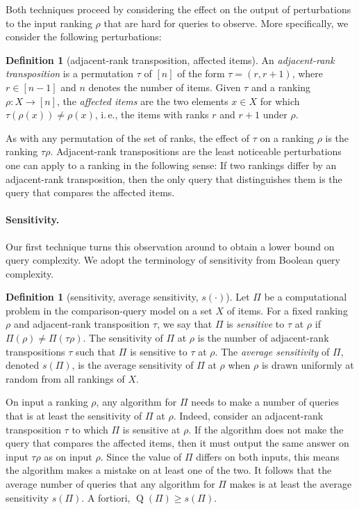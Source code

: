 \documentclass[11pt]{article}
\numberwithin{equation}{section}
\theoremstyle{definition}
\newtheorem{definition}[theorem]{Definition}
\theoremstyle{plain}
\newcommand{\ie}{i.\,e.}
\newcommand{\ranking}{\rho}
\newcommand{\transposition}{\tau}
\DeclareMathOperator{\DQ}{Q}
\begin{document}
Both techniques proceed by considering the effect on the output of perturbations to the input ranking $\ranking$ that are hard for queries to observe. More specifically, we consider the following perturbations:
\begin{definition}[adjacent-rank transposition, affected items]
An \emph{adjacent-rank transposition} is a permutation $\transposition$ of $[n]$ of the form $\transposition = (r,r+1)$, where $r \in [n-1]$ and $n$ denotes the number of items. Given $\transposition$ and a ranking $\ranking: X \to [n]$, the \emph{affected items} are the two elements $x \in X$ for which $\transposition(\ranking(x)) \ne \ranking(x)$, \ie, the items with ranks $r$ and $r+1$ under $\ranking$. 
\end{definition}
As with any permutation of the set of ranks, the effect of $\transposition$ on a ranking $\ranking$ is the ranking $\transposition \ranking$. 
Adjacent-rank transpositions are the least noticeable perturbations one can apply to a ranking in the following sense: If two rankings differ by an adjacent-rank transposition, then the only query that distinguishes them is the query that compares the affected items. 

\paragraph{Sensitivity.}
Our first technique turns this observation around to obtain a lower bound on query complexity. We adopt the terminology of sensitivity from Boolean query complexity. 

\begin{definition}[sensitivity, average sensitivity, $s(\cdot)$]\label{def:sensitivity}
Let $\Pi$ be a computational problem in the comparison-query model on a set $X$ of items. For a fixed ranking $\ranking$ and adjacent-rank transposition $\transposition$, we say that $\Pi$ is \emph{sensitive} to $\transposition$ at $\ranking$ if $\Pi(\ranking) \ne \Pi(\transposition \ranking)$. The sensitivity of $\Pi$ at $\ranking$ is the number of adjacent-rank transpositions $\transposition$ such that $\Pi$ is sensitive to $\transposition$ at $\ranking$. The \emph{average sensitivity} of $\Pi$, denoted $s(\Pi)$, is the average sensitivity of $\Pi$ at $\ranking$ when $\ranking$ is drawn uniformly at random from all rankings of $X$.
\end{definition}
On input a ranking $\ranking$, any algorithm for $\Pi$ needs to make a number of queries that is at least the sensitivity of $\Pi$ at $\ranking$. Indeed, consider an adjacent-rank transposition $\transposition$ to which $\Pi$ is sensitive at $\ranking$. If the algorithm does not make the query that compares the affected items, then it must output the same answer on input $\transposition \ranking$ as on input $\ranking$. Since the value of $\Pi$ differs on both inputs, this means the algorithm makes a mistake on at least one of the two. It follows that the average number of queries that any algorithm for $\Pi$ makes is at least the average sensitivity $s(\Pi)$. A fortiori, $\DQ(\Pi) \ge s(\Pi)$. 
\end{document}
